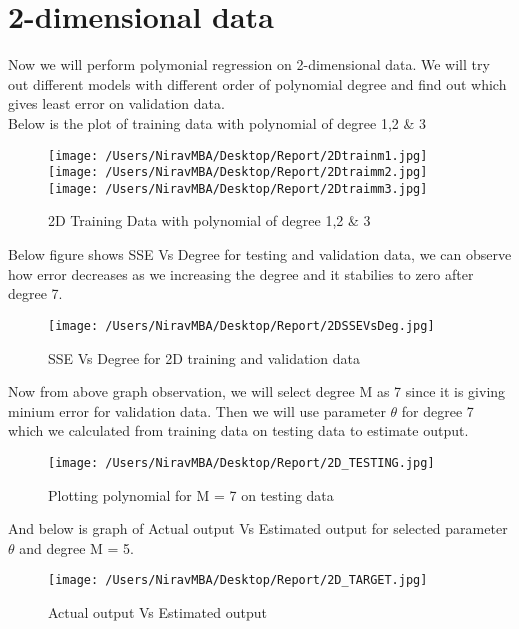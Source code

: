 \documentclass[12pt]{report}
\begin{document}
\section{2-dimensional data}

Now we will perform polymonial regression on 2-dimensional data. We will try out different models with different order of polynomial degree and find out which gives least error on validation data.\\

Below is the plot of training data with polynomial of degree 1,2 \& 3\\
\begin{figure}[H]
	\centering
	\texttt{[image: /Users/NiravMBA/Desktop/Report/2Dtrainm1.jpg]}
		\texttt{[image: /Users/NiravMBA/Desktop/Report/2Dtraimm2.jpg]}
			\texttt{[image: /Users/NiravMBA/Desktop/Report/2Dtraimm3.jpg]}
	\caption{2D Training Data with polynomial of degree 1,2 \& 3 }
\end{figure}


Below figure shows SSE Vs Degree for testing and validation data, we can observe  how error decreases as we increasing the degree and it stabilies to zero after degree 7.\\ 

\begin{figure}[H]
	\centering
	\texttt{[image: /Users/NiravMBA/Desktop/Report/2DSSEVsDeg.jpg]}
	\caption{SSE Vs Degree for 2D training and validation data }
\end{figure}



Now from above graph observation, we will select degree M as 7 since it is giving minium error for validation data. Then we will use parameter $ {\theta } $ for degree 7 which we calculated from training data on testing data to estimate output.\\

\begin{figure}[H]
	
	\texttt{[image: /Users/NiravMBA/Desktop/Report/2D\_TESTING.jpg]}
	\caption{Plotting polynomial for M = 7 on testing data}
\end{figure}

And below is graph of Actual output Vs Estimated output for selected parameter $ {\theta } $ and degree M = 5.


\begin{figure}[H]
	
	\texttt{[image: /Users/NiravMBA/Desktop/Report/2D\_TARGET.jpg]}
	\caption{Actual output Vs Estimated output}
\end{figure}
\end{document}
